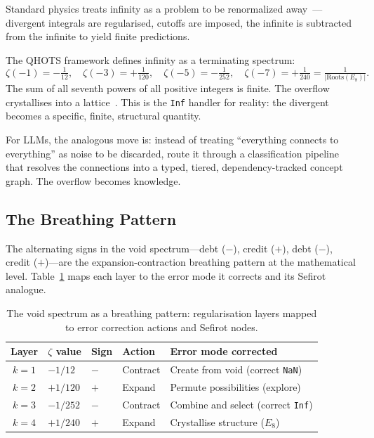 \documentclass[11pt]{article}
\theoremstyle{definition}
\theoremstyle{remark}
\newcommand{\NaN}{\texttt{NaN}}
\newcommand{\Inf}{\texttt{Inf}}
\begin{document}
Standard physics treats infinity as a problem to be renormalized
away~\cite{wilson1975rg}---divergent integrals are regularised, cutoffs are
imposed, the infinite is subtracted from the infinite to yield finite
predictions.

The QHOTS framework defines infinity as a terminating spectrum:
\[
  \zeta(-1)=-\tfrac{1}{12},\quad
  \zeta(-3)=+\tfrac{1}{120},\quad
  \zeta(-5)=-\tfrac{1}{252},\quad
  \zeta(-7)=+\tfrac{1}{240}=\tfrac{1}{|\mathrm{Roots}(E_8)|}.
\]
The sum of all seventh powers of all positive integers is finite.  The overflow
crystallises into a lattice~\cite{lisi2007e8}.  This is the \Inf{} handler for
reality: the divergent becomes a specific, finite, structural quantity.

For LLMs, the analogous move is: instead of treating ``everything connects to
everything'' as noise to be discarded, route it through a classification pipeline
that resolves the connections into a typed, tiered, dependency-tracked concept
graph.  The overflow becomes knowledge.

\subsection{The Breathing Pattern}
\label{sec:breathing-pattern}

The alternating signs in the void spectrum---debt ($-$), credit ($+$),
debt ($-$), credit ($+$)---are the expansion-contraction breathing pattern at
the mathematical level.  Table~\ref{tab:breathing} maps each layer to the error
mode it corrects and its Sefirot analogue.

\begin{table}[ht]
\centering
\caption{The void spectrum as a breathing pattern: regularisation layers mapped
  to error correction actions and Sefirot nodes.}
\label{tab:breathing}
\begin{tabular}{@{}cllll@{}}
\toprule
\textbf{Layer} & $\zeta$ \textbf{value} & \textbf{Sign} & \textbf{Action}
  & \textbf{Error mode corrected} \\
\midrule
$k=1$ & $-1/12$  & $-$ & Contract & Create from void (correct \NaN) \\
$k=2$ & $+1/120$ & $+$ & Expand   & Permute possibilities (explore) \\
$k=3$ & $-1/252$ & $-$ & Contract & Combine and select (correct \Inf) \\
$k=4$ & $+1/240$ & $+$ & Expand   & Crystallise structure ($E_8$) \\
\bottomrule
\end{tabular}
\end{table}
\end{document}
